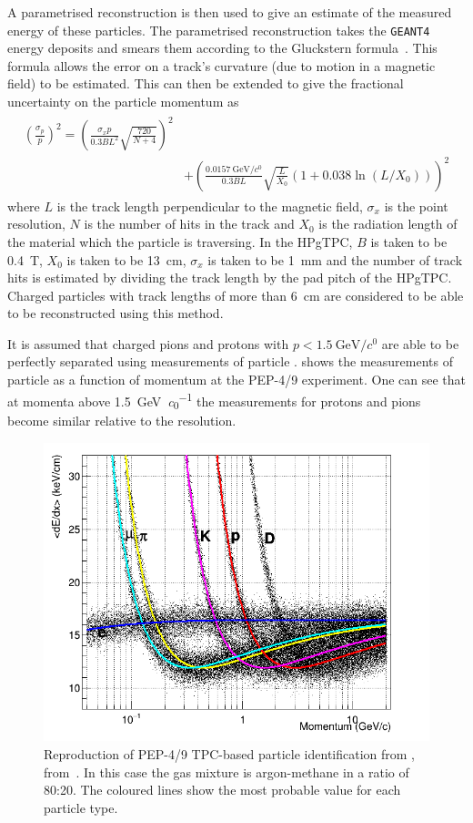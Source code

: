 A parametrised reconstruction is then used to give an estimate of the measured energy of these particles.
The parametrised reconstruction takes the \texttt{GEANT4} energy deposits and smears them according to the Gluckstern formula~\cite{gluckstern}.
This formula allows the error on a track's curvature (due to motion in a magnetic field) to be estimated.
This can then be extended to give the fractional uncertainty on the particle momentum as
\begin{align}
\begin{split}
	\left(\frac{\sigma_{p}}{p}\right)^{2} = \left( \frac{\sigma_{x} p}{0.3 B L^{2}} \sqrt{ \frac{720}{N+4} } \right)^{2} \\
	&+ \left( \frac{\SI{0.0157}{\GeV\per\clight}}{0.3BL}\sqrt{\frac{L}{X_{0}}}\left( 1 + 0.038 \ln(L/X_{0}) \right) \right)^{2}
\end{split}
\end{align}
where $L$ is the track length perpendicular to the magnetic field, $\sigma_{x}$ is the point resolution, $N$ is the number of hits in the track and $X_0$ is the radiation length of the material which the particle is traversing.
In the HPgTPC, $B$ is taken to be \SI{0.4}{\tesla}, $X_{0}$ is taken to be \SI{13}{\cm}, $\sigma_{x}$ is taken to be \SI{1}{\mm} and the number of track hits is estimated by dividing the track length by the pad pitch of the HPgTPC.
Charged particles with track lengths of more than \SI{6}{\cm} are considered to be able to be reconstructed using this method.

It is assumed that charged pions and protons with $p < \SI{1.5}{\GeV\per\clight}$ are able to be perfectly separated using measurements of particle \dedx.
 shows the measurements of particle \dedx as a function of momentum at the PEP-4/9 experiment. 
One can see that at momenta above \SI{1.5}{\GeV\per\clight} the \dedx measurements for protons and pions become similar relative to the \dedx resolution.

\begin{figure}[h]
	\centering
	\includegraphics[width=.6\linewidth]{files/figures/dune_ndrwt/pep4_dedx_reproduction}
	\caption[PEP-4/9 TPC-based particle identification from \dedx]{Reproduction of PEP-4/9 TPC-based particle identification from \dedx, from~\cite{pep4}. In this case the gas mixture is argon-methane in a ratio of 80:20. The coloured lines show the most probable value for each particle type.}
	\label{fig:pep4dedx}
\end{figure}

